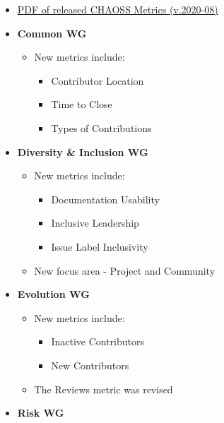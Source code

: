 \begin{itemize}
\tightlist
\item
  \href{https://chaoss.github.io/website/release/release-pdfs/CHAOSS-Metrics-Release-2020-08.pdf}{PDF
  of released CHAOSS Metrics (v.2020-08)}
\item
  \textbf{Common WG}

  \begin{itemize}
  \tightlist
  \item
    New metrics include:

    \begin{itemize}
    \tightlist
    \item
      Contributor Location
    \item
      Time to Close
    \item
      Types of Contributions
    \end{itemize}
  \end{itemize}
\item
  \textbf{Diversity \& Inclusion WG}

  \begin{itemize}
  \tightlist
  \item
    New metrics include:

    \begin{itemize}
    \tightlist
    \item
      Documentation Usability
    \item
      Inclusive Leadership
    \item
      Issue Label Inclusivity
    \end{itemize}
  \item
    New focus area - Project and Community
  \end{itemize}
\item
  \textbf{Evolution WG}

  \begin{itemize}
  \tightlist
  \item
    New metrics include:

    \begin{itemize}
    \tightlist
    \item
      Inactive Contributors
    \item
      New Contributors
    \end{itemize}
  \item
    The Reviews metric was revised
  \end{itemize}
\item
  \textbf{Risk WG}


\end{itemize}
